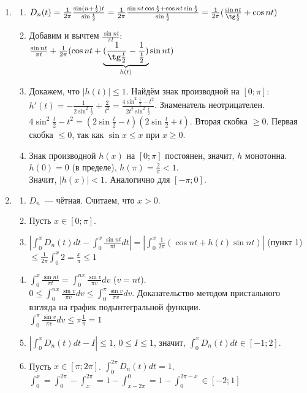 \documentclass[paper=a4, fontsize=17pt]{article}
\begin{document}
\begin{enumerate}
    \item \begin{enumerate}
        \item $D_n(t) = \frac{1}{2\pi} \frac{\sin(n+\frac{1}{2})t}{\sin\frac{t}{2}} =
            \frac{1}{2\pi} \frac{\sin nt \cos \frac{t}{2} + \cos nt \sin \frac{t}{2}}{\sin\frac{t}{2}} =
            \frac{1}{2\pi}(\frac{\sin nt}{\tg\frac{t}{2}} + \cos nt)$
        \item Добавим и вычтем $\frac{\sin nt}{\pi t}$:\\
            $\frac{\sin nt}{\pi t} + \frac{1}{2\pi} (\cos nt + \underbrace{(\frac{1}{\tg \frac{t}{2}} - \frac{1}{\frac{t}{2}})}_{h(t)} \sin nt)$
        \item Докажем, что $|h(t)| \leq 1$. Найдём знак производной на $[0;\pi]$:\\
            $h'(t) = -\frac{1}{2\sin^2 \frac{t}{2}} + \frac{2}{t^2} = \frac{4\sin^2\frac{t}{2} - t^2}{2t^2\sin^2 \frac{t}{2}}$.
            Знаменатель неотрицателен.\\
            $4\sin^2\frac{t}{2} - t^2 = (2\sin\frac{t}{2} - t)(2\sin\frac{t}{2} + t)$. Вторая скобка $\geq 0$.
            Первая скобка $\leq 0$, так как $\sin x \leq x$ при $x \geq 0$.
        \item Знак производной $h(x)$ на $[0;\pi]$ постоянен, значит, $h$ монотонна. $h(0)=0$ (в пределе), $h(\pi)=\frac{2}{\pi} < 1$.\\
            Значит, $|h(x)| < 1$. Аналогично для $[-\pi;0]$.
    \end{enumerate}
    \item \begin{enumerate}
        \item $D_n$~--- чётная. Считаем, что $x > 0$.
        \item Пусть $x \in [0;\pi]$.
        \item $|\int_0^x D_n(t) dt - \int_0^x \frac{\sin nt}{\pi t}dt| = |\int_0^x \frac{1}{2\pi}(\cos nt + h(t)\sin nt)|$
        (пункт 1)\\
            $\leq \frac{1}{2\pi}\int_0^x 2 = \frac{x}{\pi} \leq 1$
        \item $\int_0^x \frac{\sin nt}{\pi t} = \int_0^{nx} \frac{\sin v}{\pi v} dv$ ($v = nt$).\\
            $0 \leq \int_0^{nx} \frac{\sin v}{\pi v} dv \leq \int_0^\pi \frac{\sin v}{\pi v} dv$.
            Доказательство методом пристального взгляда на график подынтегральной функции.\\
            $\int_0^\pi \frac{\sin v}{\pi v} dv \leq \pi \frac{1}{\pi} = 1$
        \item $|\int_0^x D_n(t) dt - I| \leq 1$, $0 \leq I \leq 1$, значит, $\int_0^x D_n(t) dt \in [-1;2]$.
        \item Пусть $x \in [\pi;2\pi]$. $\int_0^{2\pi}D_n(t) dt = 1$.\\
            $\int_0^x = \int_0^{2\pi} - \int_x^{2\pi} = 1 - \int_{x-2\pi}^0 = 1 - \int_0^{2\pi-x} \in [-2;1]$
    \end{enumerate}
\end{enumerate}
\end{document}
